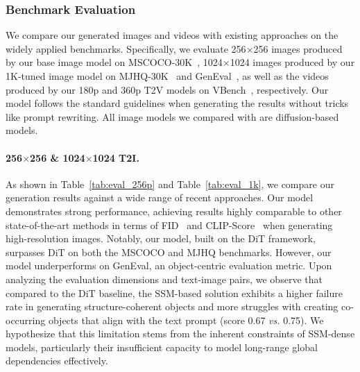 \subsubsection{Benchmark Evaluation}
We compare our generated images and videos with existing approaches on the widely applied benchmarks. Specifically, we evaluate 256$\times$256 images produced by our base image model on MSCOCO-30K~\citep{lin2014mscoco}, 1024$\times$1024 images produced by our 1K-tuned image model on MJHQ-30K~\citep{li2024playground} and GenEval~\citep{ghosh2024geneval}, as well as the videos produced by our 180p and 360p T2V models on VBench~\citep{huang2024vbench}, respectively. Our model follows the standard guidelines when generating the results without tricks like prompt rewriting. All image models we compared with are diffusion-based models.


\paragraph{256$\times$256 \& 1024$\times$1024 T2I.} 
As shown in Table~\ref{tab:eval_256p} and Table~\ref{tab:eval_1k}, we compare our generation results against a wide range of recent approaches. Our \ours{} model demonstrates strong performance, achieving results highly comparable to other state-of-the-art methods in terms of FID~\citep{heusel2017fid} and CLIP-Score~\citep{radford2021clip} when generating high-resolution images. Notably, our model, built on the DiT framework, surpasses DiT on both the MSCOCO and MJHQ benchmarks.
However, our model underperforms on GenEval, an object-centric evaluation metric. Upon analyzing the evaluation dimensions and text-image pairs, we observe that compared to the DiT baseline, the SSM-based solution exhibits a higher failure rate in generating structure-coherent objects and more struggles with creating co-occurring objects that align with the text prompt (score 0.67 \textit{vs.} 0.75). We hypothesize that this limitation stems from the inherent constraints of SSM-dense models, particularly their insufficient capacity to model long-range global dependencies effectively.


